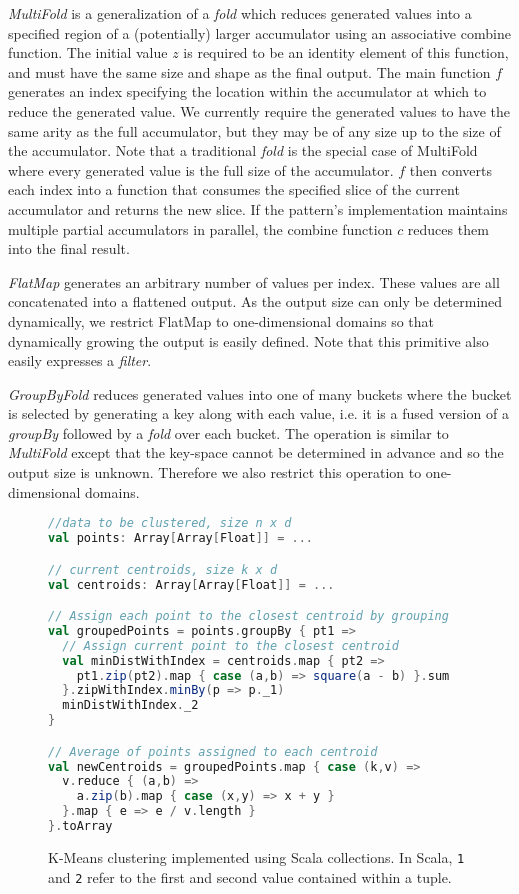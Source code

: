 \emph{MultiFold} is a generalization of a \emph{fold} which reduces generated values into a specified region of a (potentially) larger accumulator using an associative combine function.
The initial value $z$ is required to be an identity element of this function, and must have the same size and shape as the final output.
The main function $f$ generates an index specifying the location within the accumulator at which to reduce the generated value. We currently require the generated values to have the same arity as the full accumulator, but they may be of any size up to the size of the accumulator. Note that a traditional \emph{fold} is the special case of MultiFold where every generated value is the full size of the accumulator.
$f$ then converts each index into a function that consumes the specified slice of the current accumulator and returns the new slice. If the pattern's implementation maintains multiple partial accumulators in parallel, the combine function $c$ reduces them into the final result.

\emph{FlatMap} generates an arbitrary number of values per index.
These values are all concatenated into a flattened output.
As the output size can only be determined dynamically, we restrict FlatMap to one-dimensional domains so that dynamically growing the output is easily defined.
Note that this primitive also easily expresses a \emph{filter}.

\emph{GroupByFold} reduces generated values into one of many buckets where the bucket is selected by generating a key along with each value, i.e. it is a fused version of a \emph{groupBy} followed by a \emph{fold} over each bucket.
The operation is similar to \emph{MultiFold} except that the key-space cannot be determined in advance and so the output size is unknown.
Therefore we also restrict this operation to one-dimensional domains.




\begin{figure}
\centering
\begin{lstlisting}[language=Scala]
//data to be clustered, size n x d
val points: Array[Array[Float]] = ...

// current centroids, size k x d
val centroids: Array[Array[Float]] = ...

// Assign each point to the closest centroid by grouping
val groupedPoints = points.groupBy { pt1 =>
  // Assign current point to the closest centroid
  val minDistWithIndex = centroids.map { pt2 =>
    pt1.zip(pt2).map { case (a,b) => square(a - b) }.sum
  }.zipWithIndex.minBy(p => p._1)
  minDistWithIndex._2
}

// Average of points assigned to each centroid
val newCentroids = groupedPoints.map { case (k,v) =>
  v.reduce { (a,b) =>
    a.zip(b).map { case (x,y) => x + y }
  }.map { e => e / v.length }
}.toArray
\end{lstlisting}
\caption{K-Means clustering implemented using Scala collections. In Scala, \textunderscore\texttt{1} and \textunderscore\texttt{2} refer to the first and second value contained within a tuple.}
\label{fig:kmeans}
\end{figure}

